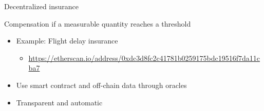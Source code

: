 \documentclass{beamer}
\begin{document}


\begin{frame}{Decentralized insurance}
\begin{tcolorbox}[enhanced,drop shadow, title=Parametric insurance]
    Compensation if a measurable quantity reaches a threshold 
\end{tcolorbox}
\begin{itemize}
  \item Example: Flight delay insurance
  \begin{itemize}
    \item \url{https://etherscan.io/address/0xdc3d8fc2c41781b0259175bdc19516f7da11cba7}
  \end{itemize}
  \item Use smart contract and off-chain data through oracles
  \item Transparent and automatic
\end{itemize}
\end{frame}
\end{document}
